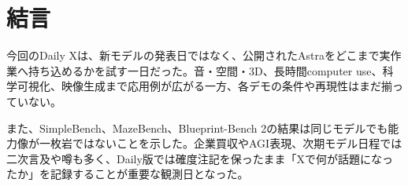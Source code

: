 \section{結言}
今回のDaily Xは、新モデルの発表日ではなく、公開されたAstraをどこまで実作業へ持ち込めるかを試す一日だった。音・空間・3D、長時間computer use、科学可視化、映像生成まで応用例が広がる一方、各デモの条件や再現性はまだ揃っていない。

また、SimpleBench、MazeBench、Blueprint-Bench 2の結果は同じモデルでも能力像が一枚岩ではないことを示した。企業買収やAGI表現、次期モデル日程では二次言及や噂も多く、Daily版では確度注記を保ったまま「Xで何が話題になったか」を記録することが重要な観測日となった。
